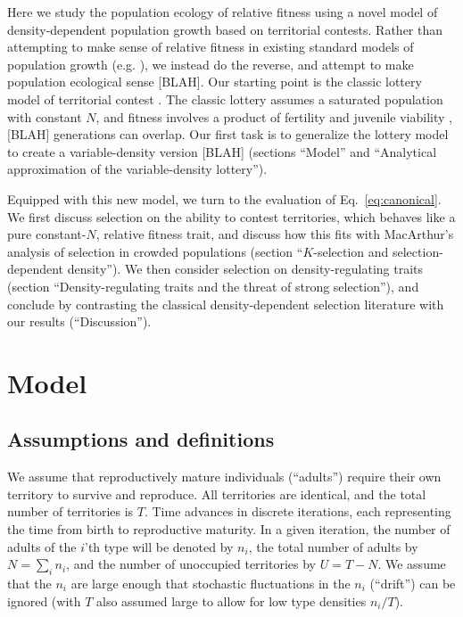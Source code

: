 \documentclass[12pt]{article}
\begin{document}
Here we study the population ecology of relative fitness using a novel model of density-dependent population growth based on territorial contests. Rather than attempting to make sense of relative fitness in existing standard models of population growth (e.g. \citep{kimura1969natural,mallet_2012}), we instead do the reverse, and attempt to make population ecological sense [BLAH]. Our starting point is the classic lottery model of territorial contest \citep{sale_77,chesson_1981}. The classic lottery assumes a saturated population with constant $N$, and fitness involves a product of fertility and juvenile viability \citep[pp. 185]{crow_1970}, [BLAH] generations can overlap. Our first task is to generalize the lottery model to create a variable-density version [BLAH] (sections ``Model'' and ``Analytical approximation of the variable-density lottery''). 

Equipped with this new model, we turn to the evaluation of Eq.~\eqref{eq:canonical}. We first discuss selection on the ability to contest territories, which behaves like a pure constant-$N$, relative fitness trait, and discuss how this fits with MacArthur's analysis of selection in crowded populations (section ``$K$-selection and selection-dependent density''). We then consider selection on density-regulating traits (section ``Density-regulating traits and the threat of strong selection''), and conclude by contrasting the classical density-dependent selection literature with our results (``Discussion'').
 
\section*{Model}\label{sec:model}

\subsection*{Assumptions and definitions} 

We assume that reproductively mature individuals (``adults'') require their own territory to survive and reproduce. All territories are identical, and the total number of territories is $T$. Time advances in discrete iterations, each representing the time from birth to reproductive maturity. In a given iteration, the number of adults of the $i$'th type will be denoted by $n_i$, the total number of adults by $N=\sum_i n_i$, and the number of unoccupied territories by $U=T-N$. We assume that the $n_i$ are large enough that stochastic fluctuations in the $n_i$ (``drift'') can be ignored (with $T$ also assumed large to allow for low type densities $n_i/T$).
\end{document}
